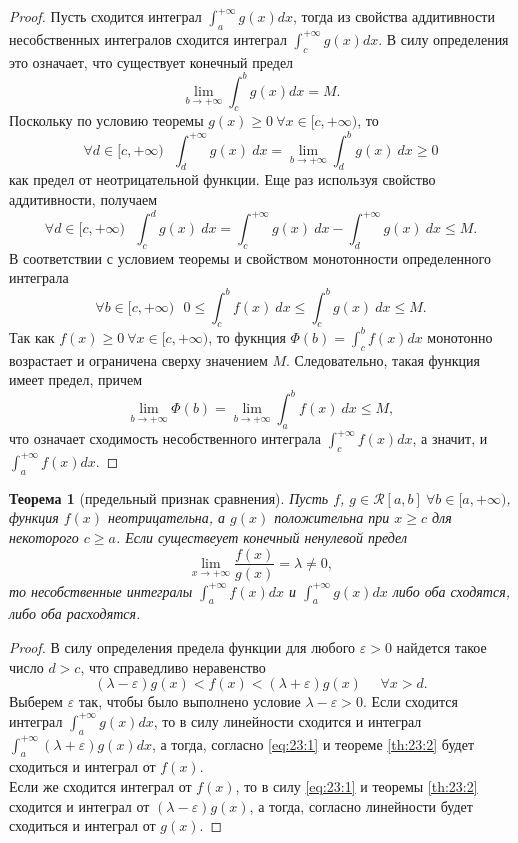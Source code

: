 \documentclass[12pt]{report}
\numberwithin{equation}{section}
\newtheorem{theorem}{Теорема}[section]
\begin{document}
\begin{proof}
Пусть сходится интеграл $\int_a^{+\infty}g(x)dx$, тогда из свойства аддитивности несобственных интегралов сходится интеграл $\int_c^{+\infty}g(x)dx$. В силу определения это означает, что существует конечный предел
\[ \lim_{b \to +\infty}\int_c^b g(x)dx = M.\]
Поскольку по условию теоремы $g(x) \geqslant 0~\forall x \in [c, +\infty)$, то
\[ \forall d \in [c, +\infty)~~~ \int_d^{+\infty} g(x)~dx = \lim_{b \to +\infty} \int_d^b g(x)~dx \geqslant 0\]
как предел от неотрицательной функции. Еще раз используя свойство аддитивности, получаем
\[ \forall d \in [c, +\infty)~~~ \int_c^d g(x)~dx = \int_c^{+\infty} g(x)~dx - \int_d^{+\infty} g(x)~dx \leqslant M.\]
В соответствии с условием теоремы и свойством монотонности определенного интеграла
\[ \forall b \in [c, +\infty)~~~ 0 \leqslant \int_c^b f(x)~dx \leqslant \int_c^b g(x)~dx \leqslant M.\]
Так как $f(x) \geqslant 0~\forall x \in [c,+\infty)$, то фукнция $\Phi(b) = \int_c^b f(x)dx$ монотонно возрастает и ограничена сверху значением $M$. Следовательно, такая функция имеет предел, причем
\[ \lim_{b \to +\infty} \Phi(b) = \lim_{b \to +\infty} \int_a^b f(x)~dx \leqslant M, \]
что означает сходимость несобственного интеграла $\int_c^{+\infty}f(x)dx$, а значит, и $\int_a^{+\infty}f(x)dx$.
\end{proof}

\begin{theorem} [предельный признак сравнения] \label{th:23:3}
Пусть $f$, $g \in \mathcal{R}[a,b]~\forall b \in [a, + \infty)$, функция $f(x)$ неотрицательна, а $g(x)$ положительна при $x \geqslant c$ для некоторого $c \geqslant a$. Если существеует конечный ненулевой предел
\[ \lim_{x \to + \infty} \frac{f(x)}{g(x)} = \lambda \neq 0,\]
то несобственные интегралы $\int_a^{+ \infty} f(x)dx$ и $\int_a^{+ \infty} g(x)dx$ либо оба сходятся, либо оба расходятся.
\end{theorem}
\begin{proof}
 В силу определения предела функции для любого $\varepsilon > 0$ найдется такое  число $d > c$, что справедливо неравенство
\begin{equation} \label {eq:23:1}
(\lambda - \varepsilon) g(x) < f(x) < (\lambda + \varepsilon) g(x)~~~~~~\forall x > d.
\end{equation}
Выберем $\varepsilon$ так, чтобы было выполнено условие $\lambda - \varepsilon > 0$. Если сходится интеграл $\int_a^{+\infty}g(x)dx$, то в силу линейности сходится и интеграл $\int_a^{+\infty}(\lambda + \varepsilon) g(x)dx$, а тогда, согласно \eqref{eq:23:1} и теореме \ref{th:23:2} будет сходиться и интеграл от $f(x)$.\\

Если же сходится интеграл от $f(x)$, то в силу \eqref{eq:23:1} и теоремы \ref{th:23:2} сходится и интеграл от $(\lambda - \varepsilon)g(x)$, а тогда, согласно линейности будет сходиться и интеграл от $g(x)$.
\end{proof}
\end{document}
